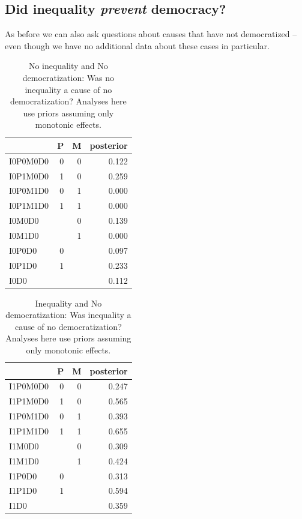 \documentclass[
  12pt,
]{book}
\begin{document}
\hypertarget{did-inequality-prevent-democracy}{%
\subsection{\texorpdfstring{Did inequality \emph{prevent} democracy?}{Did inequality prevent democracy?}}\label{did-inequality-prevent-democracy}}

As before we can also ask questions about causes that have not democratized -- even though we have no additional data about these cases in particular.

\begin{table}

\caption{\label{tab:Tapp101}No inequality and No democratization: Was no inequality a cause of no democratization? Analyses here use priors assuming only monotonic effects.}
\centering
\begin{tabular}[t]{l|r|r|r}
\hline
  & P & M & posterior\\
\hline
I0P0M0D0 & 0 & 0 & 0.122\\
\hline
I0P1M0D0 & 1 & 0 & 0.259\\
\hline
I0P0M1D0 & 0 & 1 & 0.000\\
\hline
I0P1M1D0 & 1 & 1 & 0.000\\
\hline
I0M0D0 &  & 0 & 0.139\\
\hline
I0M1D0 &  & 1 & 0.000\\
\hline
I0P0D0 & 0 &  & 0.097\\
\hline
I0P1D0 & 1 &  & 0.233\\
\hline
I0D0 &  &  & 0.112\\
\hline
\end{tabular}
\end{table}

\begin{table}

\caption{\label{tab:Tapp102}Inequality and No democratization: Was inequality a cause of no democratization? Analyses here use priors assuming only monotonic effects.}
\centering
\begin{tabular}[t]{l|r|r|r}
\hline
  & P & M & posterior\\
\hline
I1P0M0D0 & 0 & 0 & 0.247\\
\hline
I1P1M0D0 & 1 & 0 & 0.565\\
\hline
I1P0M1D0 & 0 & 1 & 0.393\\
\hline
I1P1M1D0 & 1 & 1 & 0.655\\
\hline
I1M0D0 &  & 0 & 0.309\\
\hline
I1M1D0 &  & 1 & 0.424\\
\hline
I1P0D0 & 0 &  & 0.313\\
\hline
I1P1D0 & 1 &  & 0.594\\
\hline
I1D0 &  &  & 0.359\\
\hline
\end{tabular}
\end{table}
\end{document}
